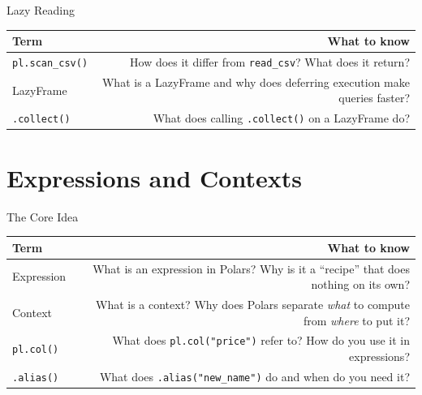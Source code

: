 \documentclass[9pt,aspectratio=169]{beamer}
\begin{document}
\begin{frame}{Lazy Reading}

\begin{tabular}{@{}lR@{}}
\toprule
\textbf{Term} & \textbf{What to know} \\
\midrule
\alert{\texttt{pl.scan\_csv()}} & How does it differ from \texttt{read\_csv}? What does it return? \\[0.8em]
\alert{LazyFrame} & What is a LazyFrame and why does deferring execution make queries faster? \\[0.8em]
\alert{\texttt{.collect()}} & What does calling \texttt{.collect()} on a LazyFrame do? \\
\bottomrule
\end{tabular}

\end{frame}


\section{Expressions and Contexts}

\begin{frame}{The Core Idea}

\begin{tabular}{@{}lR@{}}
\toprule
\textbf{Term} & \textbf{What to know} \\
\midrule
\alert{Expression} & What is an expression in Polars? Why is it a ``recipe'' that does nothing on its own? \\[0.8em]
\alert{Context} & What is a context? Why does Polars separate \emph{what} to compute from \emph{where} to put it? \\[0.8em]
\alert{\texttt{pl.col()}} & What does \texttt{pl.col("price")} refer to? How do you use it in expressions? \\[0.8em]
\alert{\texttt{.alias()}} & What does \texttt{.alias("new\_name")} do and when do you need it? \\
\bottomrule
\end{tabular}

\end{frame}
\end{document}
